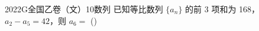 
\begin{problem}{2022}{G}{全国乙卷（文）}{10}{数列}
已知等比数列 $\{a_n\}$ 的前 3 项和为 168，$a_2-a_5=42$，则 $a_6=$
(\hspace{1cm})
\begin{choices}
\end{choices}
\end{problem}